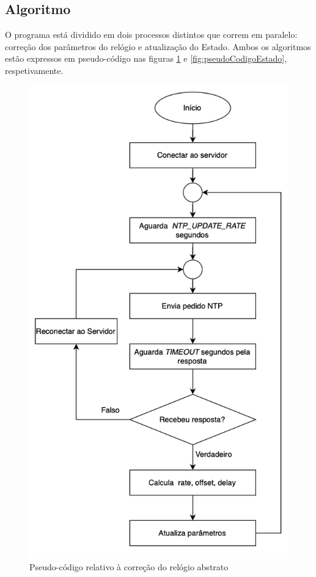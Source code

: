 \subsection{Algoritmo}
    O programa está dividido em dois processos distintos que correm em paralelo: correção dos parâmetros do relógio e atualização do Estado. Ambos os algoritmos estão expressos em pseudo-código nas figuras \ref{fig:pseudoCodigoRelogio} e \ref{fig:pseudoCodigoEstado}, respetivamente.
    
    \begin{figure}[h]
        \centering
        \includegraphics[width=0.55\linewidth]{figures/pseudoCodigoRelogio.png}
        \caption{Pseudo-código relativo à correção do relógio abstrato}
        \label{fig:pseudoCodigoRelogio}
    \end{figure}

